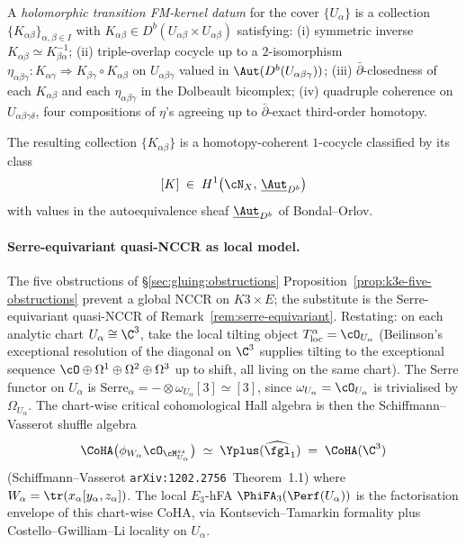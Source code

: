 \begin{definition}
\label{gluing:def:holo-fm-kernel}
A \emph{holomorphic transition FM-kernel datum} for the cover
$\{U_{\alpha}\}$ is a collection
$\{K_{\alpha\beta}\}_{\alpha,\beta\in I}$ with
$K_{\alpha\beta}\in D^{b}(U_{\alpha\beta}\times U_{\alpha\beta})$
satisfying: \textup{(i)} symmetric inverse
$K_{\alpha\beta}\simeq K_{\beta\alpha}^{-1}$; \textup{(ii)}
triple-overlap cocycle up to a $2$-isomorphism
$\eta_{\alpha\beta\gamma}:K_{\alpha\gamma}\Rightarrow
K_{\beta\gamma}\circ K_{\alpha\beta}$ on $U_{\alpha\beta\gamma}$
valued in $\Aut(D^{b}(U_{\alpha\beta\gamma}))$;
\textup{(iii)} $\bar\partial$-closedness of each $K_{\alpha\beta}$
and each $\eta_{\alpha\beta\gamma}$ in the Dolbeault bicomplex;
\textup{(iv)} quadruple coherence on $U_{\alpha\beta\gamma\delta}$,
four compositions of $\eta$'s agreeing up to
$\bar\partial$-exact third-order homotopy.
\end{definition}

The resulting collection $\{K_{\alpha\beta}\}$ is a
homotopy-coherent $1$-cocycle classified by its class
\[
[K]\;\in\; H^{1}\bigl(\cN_{X},\,\underline{\Aut}_{D^{b}}\bigr)
\]
with values in the autoequivalence sheaf $\underline{\Aut}_{D^{b}}$ of
Bondal--Orlov.

\paragraph{Serre-equivariant quasi-NCCR as local model.} The five
obstructions of \S\ref{sec:gluing:obstructions}
Proposition~\ref{prop:k3e-five-obstructions} prevent a global
NCCR on $K3\times E$; the substitute is the Serre-equivariant
quasi-NCCR of
Remark~\ref{rem:serre-equivariant}. Restating: on each analytic
chart $U_{\alpha}\cong\C^{3}$, take the local tilting object
$T_{\mathrm{loc}}^{\alpha}=\cO_{U_{\alpha}}$ (Beilinson's exceptional
resolution of the diagonal on $\C^{3}$ supplies tilting to the
exceptional sequence $\cO\oplus\Omega^{1}\oplus\Omega^{2}\oplus
\Omega^{3}$ up to shift, all living on the same chart). The Serre
functor on $U_{\alpha}$ is $\mathrm{Serre}_{\alpha}=
-\otimes\omega_{U_{\alpha}}[3]\simeq[3]$, since $\omega_{U_{\alpha}}=
\cO_{U_{\alpha}}$ is trivialised by $\Omega_{U_{\alpha}}$. The
chart-wise critical cohomological Hall algebra is then the
Schiffmann--Vasserot shuffle algebra
\[
\CoHA\bigl(\phi_{W_{\alpha}}\cO_{\cM^{ss}_{U_{\alpha}}}\bigr)
\;\simeq\;\Yplus(\widehat{\fgl}_{1})\;=\;\CoHA(\C^{3})
\]
(Schiffmann--Vasserot \texttt{arXiv:1202.2756}~Theorem~1.1) where
$W_{\alpha}=\tr(x_{\alpha}[y_{\alpha},z_{\alpha}])$. The local
$E_{3}$-hFA $\PhiFA_{3}(\Perf(U_{\alpha}))$ is the factorisation
envelope of this chart-wise CoHA, via Kontsevich--Tamarkin formality
plus Costello--Gwilliam--Li locality on $U_{\alpha}$.

